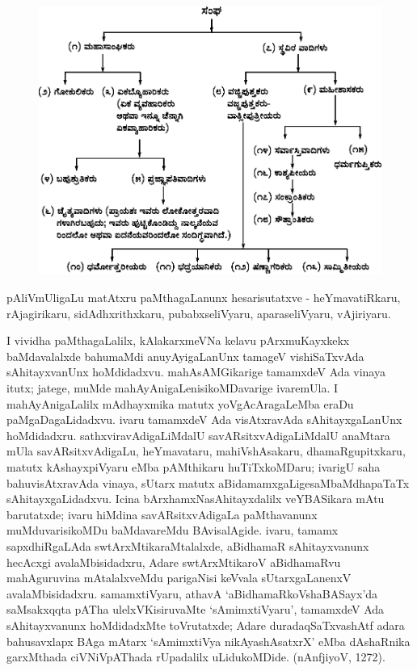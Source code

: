 \begin{figure}[h]
\centering
\includegraphics[scale=.87]{figures/fig3.eps}
\end{figure}
\noindent
pAliVmUligaLu matAtxru paMthagaLanunx hesarisutatxve - heYmavatiRkaru, rAjagirikaru, sidAdhxrithxkaru, pubabxseliVyaru, aparaseliVyaru, vAjiriyaru.

I vividha paMthagaLalilx, kAlakarxmeVNa kelavu pArxmuKayxkekx baMdavalalxde bahumaMdi anuyAyigaLanUnx tamageV vishiSaTxvAda sAhitayxvanUnx hoMdidadxvu. mahAsAMGika\-rige tamamxdeV Ada vinaya itutx; jatege, muMde mahAyAnigaLenisikoMDavarige ivare\break mUla. I mahAyAnigaLalilx  mAdhayxmika matutx yoVgAcAragaLeMba eraDu paMgaDa\-gaLidadxvu. ivaru tamamxdeV Ada visAtxravAda sAhitayxgaLanUnx  hoMdidadxru. sathxvira\-vAdigaLiMdalU savARsitxvAdigaLiMdalU anaMtara mUla savARsitxvAdigaLu, heYma\-vataru, mahiVshAsakaru, dhamaRgupitxkaru, matutx kAshayxpiVyaru eMba pAMthikaru huTiTx\break\-koMDaru; ivarigU saha bahuvisAtxravAda vinaya, sUtarx matutx aBidamamxgaLige\break saMbaMdhapaTaTx sAhitayxgaLidadxvu. Icina bArxhamxNasAhitayxdalilx veYBASikara mAtu barutatxde; ivaru hiMdina savARsitxvAdigaLa paMthavanunx muMduvarisikoMDu baMdavareMdu BAvisalAgide. ivaru, tamamx sapxdhiRgaLAda swtArxMtikaraMtalalxde, aBidhamaR sAhitayx\-vanunx hecAcxgi avalaMbisidadxru, Adare swtArxMtikaroV aBidhamaRvu mahAguruvina mAtalalxveMdu parigaNisi keVvala sUtarxgaLanenxV avalaMbisidadxru. samamxtiVyaru, athavA `aBidhamaRkoVshaBASayx'da saMsakxqqta pATha ulelxVKisiruvaMte `sAmimxtiVyaru', tamamxdeV Ada sAhitayxvanunx hoMdidadxMte toVrutatxde; Adare duradaqSaTxvashAtf adara bahusavxlapx BAga mAtarx `sAmimxtiVya nikAyashAsatxrX' eMba dAshaRnika garxMthada ciVNiVpAThada rUpadalilx uLidukoMDide. (nAnfjiyoV, 1272).

